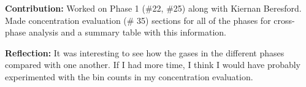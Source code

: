\textbf{Contribution:} Worked on Phase 1 (\#22, \#25) along with Kiernan Beresford. 
Made concentration evaluation (\# 35) sections for all of the phases for cross-phase analysis and a summary table with this information. 

\noindent\textbf{Reflection:} It was interesting to see how the gases in the different phases compared with one another. 
If I had more time, I think I would have probably experimented with the bin counts in my concentration evaluation. 
